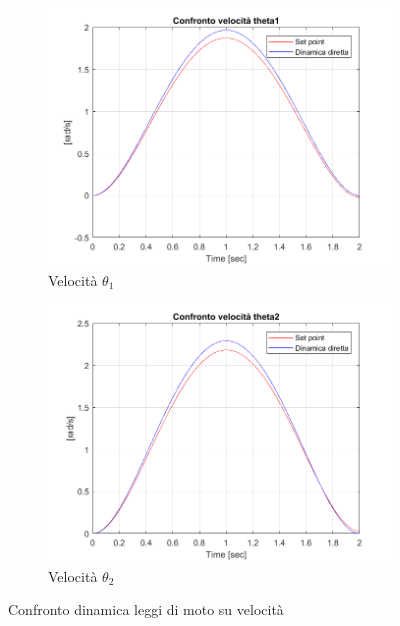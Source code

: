 \begin{figure}[!ht]
\begin{subfigure}{.45\textwidth}
  \centering
  \includegraphics[width=.78\linewidth]{Immagini/Dinamica/confrvelt1new.png}  
  \caption{Velocità $\theta_1$}
  \label{fig:sub-firstv}
\end{subfigure}
\begin{subfigure}{.45\textwidth}
  \centering
  \includegraphics[width=.78\linewidth]{Immagini/Dinamica/confrtvelt2new.png}  
  \caption{Velocità $\theta_2$}
  \label{fig:sub-secondv}
\end{subfigure}
\caption{Confronto dinamica leggi di moto su velocità}
\end{figure}
